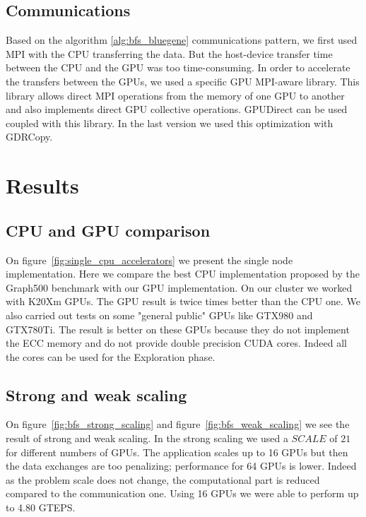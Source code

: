  
\subsection{Communications}

Based on the algorithm \ref{alg:bfs_bluegene} communications pattern, we first used MPI with the CPU transferring the data. But the host-device transfer time between the CPU and the GPU was too time-consuming. 
In order to accelerate the transfers between the GPUs, we used a specific GPU MPI-aware  library. This library allows direct MPI operations from the memory of one GPU to another and also implements direct GPU collective operations. 
GPUDirect can be used coupled with this library. In the last version we used this optimization with GDRCopy. 

\section{Results}

\subsection{CPU and GPU comparison}

On figure~\ref{fig:single_cpu_accelerators} we present the single node implementation. 
Here we compare the best CPU implementation proposed by the Graph500 benchmark with our GPU implementation. 
On our cluster we worked with K20Xm GPUs. 
The GPU result is twice times better than the CPU one. 
We also carried out tests on some "general public" GPUs like GTX980 and GTX780Ti. 
The result is better on these GPUs because they do not implement the ECC memory and do not provide double precision CUDA cores. 
Indeed all the cores can be used for the Exploration phase. 



\subsection{Strong and weak scaling}

On figure~\ref{fig:bfs_strong_scaling} and figure~\ref{fig:bfs_weak_scaling} we see the result of strong and weak scaling. 
In the strong scaling we used a $SCALE$ of $21$ for different numbers of GPUs. 
The application scales up to 16 GPUs but then the data exchanges are too penalizing;
performance for 64 GPUs is lower. 
Indeed as the problem scale does not change, the computational part is reduced compared to the communication one. 
Using 16 GPUs we were able to perform up to 4.80 GTEPS. 

